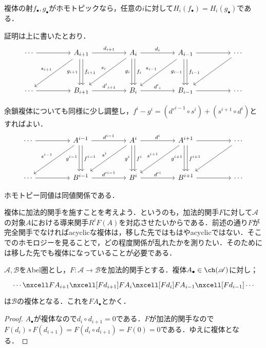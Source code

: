 \begin{prop}
	複体の射$f_\bullet,g_\bullet$がホモトピックなら，任意の$i$に対して$H_i(f_\bullet)=H_i(g_\bullet)$である．
\end{prop}

証明は上に書いたとおり．
\[\begin{tikzcd}[row sep=huge, column sep=huge]
	\cdots\arrow[r]&A_{i+1}\arrow[r,"d_{i+1}"]\arrow[d,"f_{i+1}",shift left=.5ex]\arrow[d,"g_{i+1}",swap,shift right =.5ex]\arrow[dl,"s_{i+1}",swap]&A_i\arrow[r,"d_i"]\arrow[d,"f_i",shift left=.5ex]\arrow[d,"g_i",swap,shift right=.5ex]\arrow[dl,"s_i",swap]&A_{i-1}\arrow[r]\arrow[d,"f_{i-1}",shift left=.5ex]\arrow[d,"g_{i-1}",swap,shift right=.5ex]\arrow[dl,"s_{i-1}",swap]&\cdots\arrow[dl]\\
	\cdots\arrow[r]&B_{i+1}\arrow[r,"{d'}_{i+1}"]&B_i\arrow[r,"{d'}_{i}"]&B_{i-1}\arrow[r]&\cdots
\end{tikzcd}\]

余鎖複体についても同様に少し調整し，$f^i-g^i=(d'^{i-1}\circ s^i)+(s^{i+1}\circ d^i)$とすればよい．
\[\begin{tikzcd}[row sep=huge, column sep=huge]
	\cdots\arrow[r]&A^{i-1}\arrow[r,"d^{i-1}"]\arrow[d,"f^{i-1}",shift left=.5ex]\arrow[d,"g^{i-1}",swap,shift right =.5ex]\arrow[dl,"s^{i-1}",swap]&A^i\arrow[r,"d^i"]\arrow[d,"f^i",shift left=.5ex]\arrow[d,"g^i",swap,shift right=.5ex]\arrow[dl,"s^i",swap]&A^{i+1}\arrow[r]\arrow[d,"f^{i+1}",shift left=.5ex]\arrow[d,"g^{i+1}",swap,shift right=.5ex]\arrow[dl,"s^{i+1}",swap]&\cdots\arrow[dl]\\
	\cdots\arrow[r]&B^{i-1}\arrow[r,"{d'}^{i-1}"]&B^i\arrow[r,"{d'}^{i}"]&B^{i+1}\arrow[r]&\cdots
\end{tikzcd}\]
\begin{exer}
	ホモトピー同値は同値関係である．
\end{exer}
複体に加法的関手を施すことを考えよう．というのも，加法的関手$F$に対して$\mathscr{A}$の対象$A$における導来関手$R^iF(A)$を対応させたいからである．前述の通り$F$が完全関手でなければacyclicな複体は，移した先ではもはやacyclicではない．そこでのホモロジーを見ることで，どの程度関係が乱れたかを測りたい．そのためには移した先でも複体になっていることが必要である．
\begin{prop}
	$\mathscr{A},\mathscr{B}$をAbel圏とし，$F:\mathscr{A}\to\mathscr{B}$を加法的関手とする．複体$A_\bullet\in\ch(\mathscr{A})$に対し；
	\[\begin{tikzcd}
	\cdots\nxcell F A_{i+1}\nxcell[F d_{i+1}]F A_i\nxcell[F d_i]F A_{i-1}\nxcell[F d_{i-1}]\cdots
	\end{tikzcd}\]
	は$\mathscr{B}$の複体となる．これを$F A_\bullet$とかく．
\end{prop}
\begin{proof}
	$A_\bullet$が複体なので$d_i\circ d_{i+1}=0$である．$F$が加法的関手なので$F(d_i)\circ F(d_{i+1})=F(d_i\circ d_{i+1})=F(0)=0$である．ゆえに複体となる．
\end{proof}

